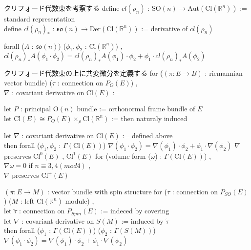 \begin{Definition}
\itemnote
  クリフォード代数束を考察する
\itemdefi
  define \(cl(\rho_n)\) : \(\text{SO}(n) \to \text{Aut}(\text{Cl}(\mathbb{R}^n))\) := standard representation \\
  define \(cl(\rho_n)_*\) : \(\mathfrak{so}(n) \to \text{Der}(\text{Cl}(\mathbb{R}^n))\) := derivative of \(cl(\rho_n)\)
\end{Definition}

\begin{Theorem}
\itemprop
  forall (\(A\) : \(\mathfrak{so}(n)\)) (\(\phi_1 , \phi_2\) : \(\text{Cl}(\mathbb{R}^n)\)) ,\\
  \({cl(\rho_n)_* A}(\phi_1 \cdot \phi_2) = {cl(\rho_n)_* A}(\phi_1) \cdot \phi_2 + \phi_1 \cdot {cl(\rho_n)_* A}(\phi_2)\)
\end{Theorem}

\begin{Definition}
\itemnote
  クリフォード代数束の上に共変微分を定義する
\itemdefi
  for (\((\pi : E \to B)\) : riemannian vector bundle)  (\(\tau\) : connection on \(P_{O}(E)\)) ,\\
  \(\nabla\) : covariant derivative on \(\text{Cl}(E)\) :=
  \begin{indentblock}
    let \(P\) : principal \(\text{O}(n)\) bundle := orthonormal frame bundle of \(E\) \\
    let \(\text{Cl}(E) \cong P_{O}(E) \times_{\rho} \text{Cl}(\mathbb{R}^n)\) := 
    then naturaly induced
  \end{indentblock}
\end{Definition}

\begin{Theorem}
\itemprop
  let \(\nabla\) : covariant derivative on \(\text{Cl}(E)\) := defined above \\
  then forall (\(\phi_1 , \phi_2\) : \(\Gamma(\text{Cl}(E))\)) \(\nabla(\phi_1 \cdot \phi_2) = \nabla(\phi_1) \cdot \phi_2 + \phi_1 \cdot \nabla(\phi_2)\)
\itemprop
  \(\nabla\) preserves \(\text{Cl}^0(E)\) , \(\text{Cl}^1(E)\)
\itemprop
  for (volume form (\(\omega\)) : \(\Gamma(\text{Cl}(E))\)) ,\\
  \(\nabla \omega = 0\)
\itemprop
  if \(n \equiv 3 , 4(mod 4)\) ,\\
  \(\nabla\) preserves \(\text{Cl}^{\pm}(E)\)
\end{Theorem}

\begin{Definition}
\itemwhen \((\pi : E \to M)\) : vector bundle with spin structure
\itemdefi
  for (\(\tau\) : connection on \(P_{SO}(E)\)) (\(M\) : left \(\text{Cl}(\mathbb{R}^n)\) module) ,\\
  let \(\tilde{\tau}\) : connection on \(P_{Spin}(E)\) := indeced by covering \\
  let \(\nabla\) : covariant derivative on \(S(M)\) := induced by \(\tilde{\tau}\)\\
  then forall (\(\phi_1\) : \(\Gamma(\text{Cl}(E))\)) (\(\phi_2\) : \(\Gamma(S(M))\)) \(\nabla(\phi_1 \cdot \phi_2) = \nabla(\phi_1) \cdot \phi_2 + \phi_1 \cdot \nabla(\phi_2)\)
\end{Definition}

